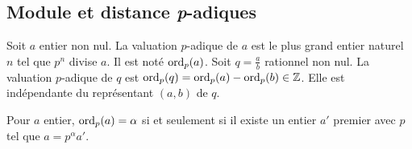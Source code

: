 \subsection{Module et distance \emph{p}-adiques}\label{SubSec:ModulPadic}
\begin{defi}
 Soit $a$ entier non nul. La valuation $p$-adique de $a$ est le plus grand entier naturel $n$ tel que $p^n$ divise $a$. Il est noté $\mathop{\mathrm{ord}}_p(a)$.\newline
 Soit $q=\frac{a}{b}$ rationnel non nul. La valuation $p$-adique de $q$ est $\mathop{\mathrm{ord}}_p(q) = \mathop{\mathrm{ord}}_p(a) - \mathop{\mathrm{ord}}_p(b) \in \mathbb{Z}$. Elle est indépendante du représentant $(a,b)$ de $q$.
\end{defi}
\begin{rem}
Pour $a$ entier, $\mathop{\mathrm{ord}}_p(a)= \alpha$ si et seulement si il existe un entier $a'$ premier avec $p$ tel que $a= p^\alpha a'$.
\end{rem}

